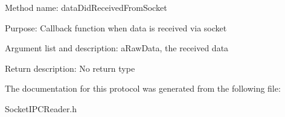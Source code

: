 \begin{DoxyItemize}
\item \-Method name\-: data\-Did\-Received\-From\-Socket
\item \-Purpose\-: \-Callback function when data is received via socket
\item \-Argument list and description\-: a\-Raw\-Data, the received data
\item \-Return description\-: \-No return type 
\end{DoxyItemize}

\-The documentation for this protocol was generated from the following file\-:\begin{DoxyCompactItemize}
\item 
\-Socket\-I\-P\-C\-Reader.\-h\end{DoxyCompactItemize}
